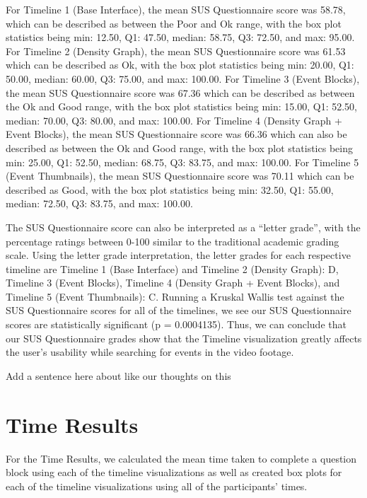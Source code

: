 \documentclass[doublespace,draft,nopageskip]{VTthesis} %
\begin{document}
For Timeline 1 (Base Interface), the mean SUS Questionnaire score was 58.78, which can be described as between the Poor and Ok range, with the box plot statistics being min: 12.50, Q1: 47.50, median: 58.75, Q3: 72.50, and max: 95.00. 
For Timeline 2 (Density Graph), the mean SUS Questionnaire score was 61.53 which can be described as Ok, with the box plot statistics being min: 20.00, Q1: 50.00, median: 60.00, Q3: 75.00, and max: 100.00. 
For Timeline 3 (Event Blocks), the mean SUS Questionnaire score was 67.36 which can be described as between the Ok and Good range, with the box plot statistics being min: 15.00, Q1: 52.50, median: 70.00, Q3: 80.00, and max: 100.00. 
For Timeline 4 (Density Graph + Event Blocks), the mean SUS Questionnaire score was 66.36 which can also be described as between the Ok and Good range, with the box plot statistics being min: 25.00, Q1: 52.50, median: 68.75, Q3: 83.75, and max: 100.00. 
For Timeline 5 (Event Thumbnails), the mean SUS Questionnaire score was 70.11 which can be described as Good, with the box plot statistics being min: 32.50, Q1: 55.00, median: 72.50, Q3: 83.75, and max: 100.00. 

The SUS Questionnaire score can also be interpreted as a “letter grade”, with the percentage ratings between 0-100 similar to the traditional academic grading scale. Using the letter grade interpretation, the letter grades for each respective timeline are Timeline 1 (Base Interface) and Timeline 2 (Density Graph): D, Timeline 3 (Event Blocks), Timeline 4 (Density Graph + Event Blocks), and Timeline 5 (Event Thumbnails): C. Running a Kruskal Wallis test against the SUS Questionnaire scores for all of the timelines, we see our SUS Questionnaire scores are statistically significant (p = 0.0004135). Thus, we can conclude that our SUS Questionnaire grades show that the Timeline visualization greatly affects the user's usability while searching for events in the video footage.

Add a sentence here about like our thoughts on this

\section{Time Results}

For the Time Results, we calculated the mean time taken to complete a question block using each of the timeline visualizations as well as created box plots for each of the timeline visualizations using all of the participants' times.
\end{document}
